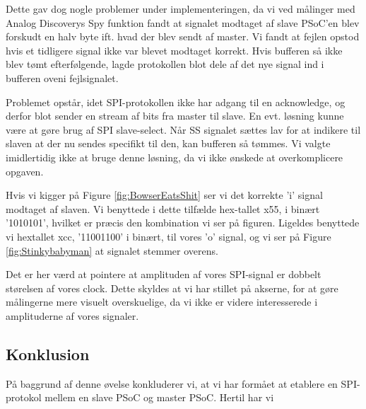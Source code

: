 \documentclass[../main.tex]{subfiles}
\begin{document}
Dette gav dog nogle problemer under implementeringen, da vi ved målinger med Analog Discoverys Spy funktion fandt at signalet modtaget af slave PSoC'en blev forskudt en halv byte 
ift. hvad der blev sendt af master. Vi fandt at fejlen opstod hvis et tidligere signal ikke var blevet modtaget korrekt. Hvis bufferen så ikke blev tømt efterfølgende, lagde protokollen 
blot dele af det nye signal ind i bufferen oveni fejlsignalet.

Problemet opstår, idet SPI-protokollen ikke har adgang til en acknowledge, og derfor blot sender en stream af bits fra master til slave. En evt. løsning kunne være at gøre brug af 
SPI slave-select. Når SS signalet sættes lav for at indikere til slaven at der nu sendes specifikt til den, kan bufferen så tømmes. Vi valgte imidlertidig ikke at bruge denne løsning,
da vi ikke ønskede at overkomplicere opgaven.

Hvis vi kigger på Figure \ref{fig:BowserEatsShit} ser vi det korrekte 'i' signal modtaget af slaven. Vi benyttede i dette tilfælde hex-tallet x55, i binært '1010101', hvilket er præcis 
den kombination vi ser på figuren. Ligeldes benyttede vi hextallet xcc, '11001100' i binært, til vores 'o' signal, og vi ser på Figure \ref{fig:Stinkybabyman} at signalet stemmer overens.

Det er her værd at pointere at amplituden af vores SPI-signal er dobbelt størelsen af vores clock. Dette skyldes at vi har stillet på akserne, for at gøre målingerne mere visuelt
 overskuelige, da vi ikke er videre interesserede i amplituderne af vores signaler.

\subsection{Konklusion}
På baggrund af denne øvelse konkluderer vi, at vi har formået at etablere en SPI-protokol mellem en slave PSoC og master PSoC. 
Hertil har vi 
\end{document}
